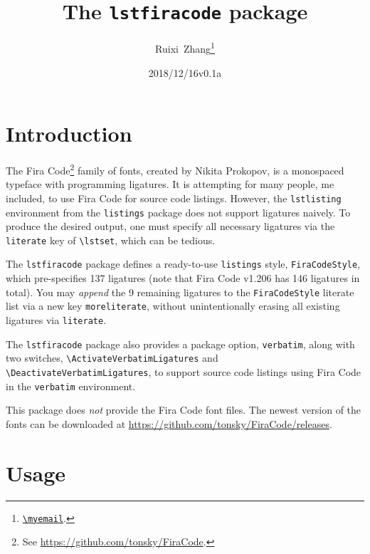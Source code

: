 \documentclass[11pt]{article}
\title{The \texttt{lstfiracode} package}
\author{Ruixi~Zhang\thanks{\href{mailto:\myemail}{\nolinkurl{\myemail}}.}}
\date{2018/12/16\enskip v0.1a}
\begin{document}
\maketitle

\tableofcontents
{}

\section{Introduction}

The Fira Code\footnote{See \url{https://github.com/tonsky/FiraCode}.} family
of fonts, created by Nikita Prokopov, is a monospaced typeface with
programming ligatures.
It is attempting for many people, me included, to use Fira Code for source
code listings.
However, the \verb|lstlisting| environment from the \verb|listings| package
does not support ligatures naively. To produce the desired output, one must
specify all necessary ligatures via the \verb|literate| key
of \verb|\lstset|, which can be tedious.

The \verb|lstfiracode| package defines a ready-to-use \verb|listings| style,
\verb|FiraCodeStyle|, which pre-specifies 137 ligatures
(note that Fira Code v1.206 has 146 ligatures in total).
You may \emph{append} the 9 remaining ligatures to the \verb|FiraCodeStyle|
literate list via a new key \verb|moreliterate|, without unintentionally
erasing all existing ligatures via \verb|literate|.

The \verb|lstfiracode| package also provides a package option,
\verb|verbatim|, along with two switches,
\verb|\ActivateVerbatimLigatures| and \verb|\DeactivateVerbatimLigatures|,
to support source code listings using Fira Code
in the \verb|verbatim| environment.

This package does \emph{not} provide the Fira Code font files.
The newest version of the fonts can be downloaded at
\url{https://github.com/tonsky/FiraCode/releases}.

\section{Usage}
\end{document}
